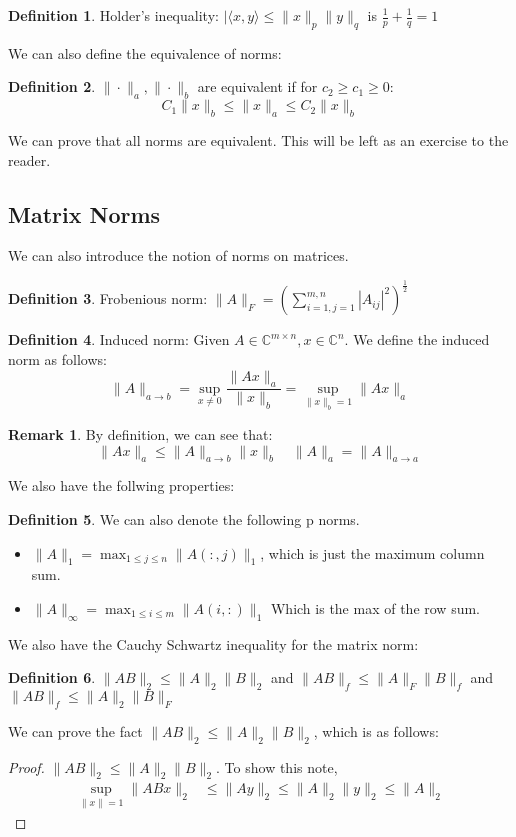 \documentclass[11pt]{article}
\theoremstyle{definition}
\newtheorem{definition}{Definition}[section]
\newtheorem{remark}{Remark}[section]
\newcommand{\C}{\mathbb{C}}
\begin{document}
\begin{definition}
  Holder's inequality: $| \langle x, y \rangle \leq \|x\|_p \|y\|_q$ is $\frac{1}{p} + \frac{1}{q} = 1$
\end{definition}
We can also define the equivalence of norms:
\begin{definition}
  $\| \cdot \|_a, \| \cdot \|_b$ are equivalent if for $c_2 \geq c_1 \geq 0$:
  \[
  C_1 \|x \|_b \leq \|x \|_a \leq C_2 \|x\|_b
  \]
\end{definition}
We can prove that all norms are equivalent. This will be left as an exercise to the reader. 
\subsection{Matrix Norms}
We can also introduce the notion of norms on matrices. 
\begin{definition}
  Frobenious norm: $\|A \|_F = \left( \sum_{i = 1, j = 1}^{m, n} |A_{ij}|^2 \right)^\frac{1}{2}$
\end{definition}
\begin{definition}
  Induced norm: Given $A \in \C^{m \times n }, x \in \C^n$. We define the induced norm as follows:
  \[
  \|A \|_{a \to b} = \sup_{x \neq 0} \frac{\|Ax\|_a}{\|x\|_b} = \sup_{\|x\|_b = 1} \|Ax \|_a
  \]
\end{definition}
\begin{remark}
  By definition, we can see that: 
  \[
  \|Ax \|_a \leq \|A\|_{a \to b} \|x\|_b \quad \|A\|_a = \|A\|_{a \to a}
  \]
\end{remark}
We also have the follwing properties:
\begin{definition}
  We can also denote the following p norms. 
  \begin{itemize}
    \item $\|A\|_1 = \max_{1 \leq j \leq n} \| A(:,j)\|_1$, which is just the maximum column sum.
    \item $\|A\|_\infty = \max_{1 \leq i \leq m} \|A(i, :)\|_1$  Which is the max of the row sum. 
  \end{itemize}
\end{definition}
We also have the Cauchy Schwartz inequality for the matrix norm:
\begin{definition}
  $\|AB\|_2 \leq \|A\|_2 \|B\|_2$ and $\|AB\|_f \leq \|A\|_F\|B\|_f$ and $\|AB\|_f \leq \|A\|_2 \|B\|_F$
\end{definition}
We can prove the fact $\|AB\|_2 \leq \|A\|_2 \|B\|_2$, which is as follows:
\begin{proof}
  $\|AB\|_2 \leq \|A\|_2 \|B\|_2$. To show this note, 
  \begin{align*}
    \sup_{\|x \| = 1} \|ABx\|_2 & \leq \|Ay\|_2 \leq \| A\|_2 \|y\|_2 \leq \|A\|_2 
  \end{align*}
\end{proof}
\end{document}
